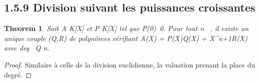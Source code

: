 \documentclass{article}
\newtheorem{theorem}{Theorem}[section]
\newenvironment{thm}
  {\begin{theorem}}
  {\end{theorem}}
\begin{document}
\subsection{1.5.9 Division suivant les puissances croissantes}

\begin{thm}
Soit A \in K[X] et P \in K[X] tel que
P(0)\neq~0. Pour tout n \in {}~, il existe un unique
couple (Q,R) de polynômes vérifiant A(X) = P(X)Q(X) +
X^n+1R(X) avec deg~ Q \leq n.
\end{thm}

\begin{proof}
Similaire à celle de la division euclidienne, la valuation
prenant la place du degré.
\end{proof}
\end{document}
